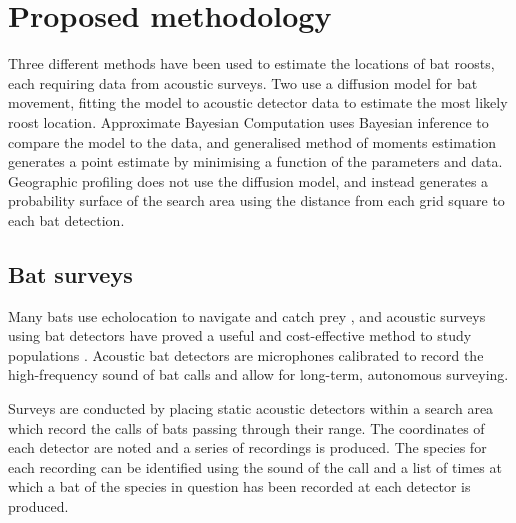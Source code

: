 
\chapter{Proposed methodology}
\label{chapter:methods}

Three different methods have been used to estimate the locations of bat roosts, each requiring data from acoustic surveys. Two use a diffusion model for bat movement, fitting the model to acoustic detector data to estimate the most likely roost location. Approximate Bayesian Computation uses Bayesian inference to compare the model to the data, and generalised method of moments estimation generates a point estimate by minimising a function of the parameters and data. Geographic profiling does not use the diffusion model, and instead generates a probability surface of the search area using the distance from each grid square to each bat detection.

\section{Bat surveys}

Many bats use echolocation to navigate and catch prey
\cite{schnitzler2003}, and acoustic surveys using bat detectors have proved a
useful and cost-effective method to study populations \cite{Walters2012}.
Acoustic bat detectors are microphones calibrated to record the high-frequency
sound of bat calls and allow for long-term, autonomous surveying.

Surveys are conducted by placing static acoustic detectors within a search
area which record the calls of bats passing through their range. The coordinates
of each detector are noted and a series of recordings is produced. The species
for each recording can be identified using the sound of the call and a list of
times at which a bat of the species in question has been recorded at each
detector is produced.

%
%
%
%
%
